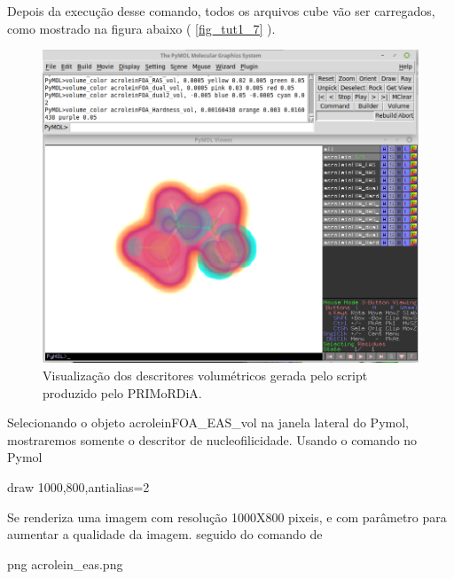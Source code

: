 \documentclass[a4paper,11pt]{refart}
\begin{document}
Depois da execução desse comando, todos os arquivos cube vão ser carregados, como mostrado na figura abaixo ( \autoref{fig_tut1_7} ). 

\hspace*{-\leftmarginwidth}
\begin{minipage}{\fullwidth}
\begin{figure}[H]
\begin{center}
\includegraphics[width=4.5in]{images/img8}
\caption{Visualização dos descritores volumétricos gerada pelo script produzido pelo PRIMoRDiA.}
\label{fig_tut1_7}
\end{center}
\end{figure}
\end{minipage}

Selecionando o objeto acroleinFOA\_EAS\_vol na janela lateral do Pymol, mostraremos somente o descritor de nucleofilicidade. Usando o comando no Pymol


\hspace*{-\leftmarginwidth}
\begin{minipage}{\fullwidth}
	\begin{pymol}draw 1000,800,antialias=2\end{pymol}
\end{minipage}


Se renderiza uma imagem com resolução 1000X800 pixeis, e com parâmetro para aumentar a qualidade da imagem. seguido do comando de

\hspace*{-\leftmarginwidth}
\begin{minipage}{\fullwidth}
	\begin{pymol}png acrolein_eas.png\end{pymol}
\end{minipage}
\end{document}
